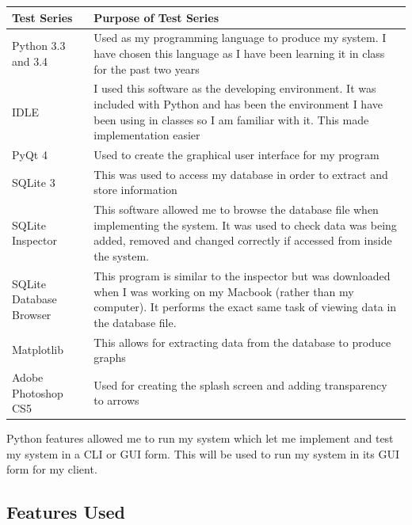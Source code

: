 \begin{center}
    \begin{tabular}{|p{4cm}|p{6cm}|}
        \hline
        \textbf{Test Series} & \textbf{Purpose of Test Series} \\ \hline
        Python 3.3 and 3.4 & Used as my programming language to produce my system. I have chosen this language as I have been learning it in class for the past two years \\ \hline
        IDLE & I used this software as the developing environment. It was included with Python and has been the environment I have been using in classes so I am familiar with it. This made implementation easier\\ \hline
        PyQt 4 & Used to create the graphical user interface for my program \\ \hline
        SQLite 3 & This was used to access my database in order to extract and store information \\ \hline
        SQLite Inspector & This software allowed me to browse the database file when implementing the system. It was used to check data was being added, removed and changed correctly if accessed from inside the system. \\ \hline
        SQLite Database Browser & This program is similar to the inspector but was downloaded when I was working on my Macbook (rather than my computer). It performs the exact same task of viewing data in the database file. \\ \hline
        Matplotlib & This allows for extracting data from the database to produce graphs \\ \hline
        Adobe Photoshop CS5 & Used for creating the splash screen and adding transparency to arrows \\ \hline
    \end{tabular}
\end{center}

Python features allowed me to run my system which let me
implement and test my system in a CLI or GUI form. This will
be used to run my system in its GUI form for my client.

\subsection{Features Used}

